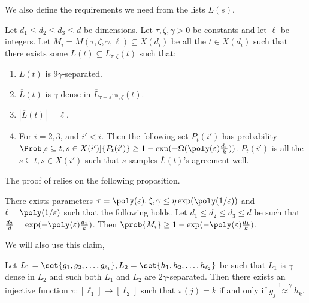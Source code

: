 We also define the requirements we need from the lists \(\overline{L}(s)\).
\begin{definition} \label{def:mi}
    Let \(d_1 \leq d_2 \leq d_3 \leq d\) be dimensions. Let \(\tau,\zeta,\gamma > 0\) be constants and let \(\ell\) be integers. Let \(M_i = M(\tau,\zeta,\gamma,\ell) \subseteq X(d_i)\) be all the \(t \in X(d_i)\) such that there exists some \(\overline{L}(t) \subseteq \overline{L}_{\tau,\zeta}(t)\) such that:
    \begin{enumerate}
        \item \(\overline{L}(t)\) is \(9\gamma\)-separated.
        \item \(\overline{L}(t)\) is \(\gamma\)-dense in \(\overline{L}_{\tau - \varepsilon^{100},\zeta}(t)\).
        \item \(|\overline{L}(t)|=\ell\).
        \item For \(i=2,3\), and \(i'< i\). Then the following set \(P_t(i')\) has probability \(\Prob[s \subseteq t, s \in X(i')]{P_t(i')} \geq 1-\exp(-\Omega(\poly(\varepsilon)\frac{d_1}{k}))\). \(P_t(i')\) is all the \(s \subseteq t, s \in X(i')\) such that \(s\) samples \(\overline{L}(t)\)'s agreement well.
    \end{enumerate}    
\end{definition}

The proof of  relies on the following proposition.
\begin{proposition} \label{prop:good-parameters}
    There exists parameters \(\tau = \poly(\varepsilon),\zeta,\gamma \leq \eta\exp(\poly(1/\varepsilon))\) and \(\ell=\poly(1/\varepsilon)\) such that the following holds. Let \(d_1\leq d_2 \leq d_3 \leq d\) be such that \(\frac{d_3}{d} = \exp(-\poly(\varepsilon)\frac{d_1}{k})\). Then \(\prob{M_i} \geq 1- \exp(-\poly(\varepsilon)\frac{d_1}{k}) \).
\end{proposition}

We will also use this claim,
\begin{claim} \label{claim:injective-function}
    Let \(L_1 = \set{g_1,g_2,\dots,g_{\ell_1}}, L_2=\set{h_1,h_2,\dots,h_{\ell_2}}\) be such that \(L_1\) is \(\gamma\)-dense in \(L_2\) and such both \(L_1\) and \(L_2\) are \(2\gamma\)-separated. Then there exists an injective function \(\pi:[\ell_1]\to [\ell_2]\) such that \(\pi(j)=k\) if and only if \(g_j \overset{1-\gamma}{\approx} h_k\).
\end{claim}

